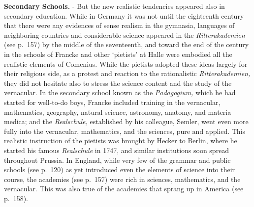 \documentclass[
]{book}
\begin{document}
\textbf{Secondary Schools.} - But the new realistic tendencies appeared also in secondary education. While in Germany it was not until the eighteenth century that there were any evidences of sense realism in the gymnasia, languages of neighboring countries and considerable science appeared in the \emph{Ritterakademien} (see p.~157) by the middle of the seventeenth, and toward the end of the century in the schools of Francke and other `pietists' at Halle were embodied all the realistic elements of Comenius. While the pietists adopted these ideas largely for their religious side, as a protest and reaction to the rationalistic \emph{Ritterakademien,} they did not hesitate also to stress the science content and the study of the vernacular. In the secondary school known as the \emph{Padagogium,} which he had started for well-to-do boys, Francke included training in the vernacular, mathematics, geography, natural science, astronomy, anatomy, and materia medica; and the \emph{Realschule,} established by his colleague, Semler, went even more fully into the vernacular, mathematics, and the sciences, pure and applied. This realistic instruction of the pietists was brought by Hecker to Berlin, where he started his famous \emph{Realschule} in 1747, and similar institutions soon spread throughout Prussia. In England, while very few of the grammar and public schools (see p.~120) as yet introduced even the elements of science into their course, the academies (see p.~157) were rich in sciences, mathematics, and the vernacular. This was also true of the academies that sprang up in America (see p.~158).
\end{document}
